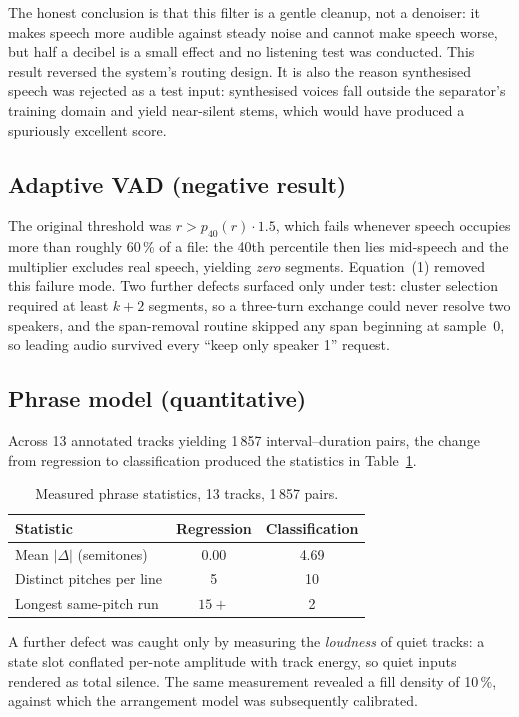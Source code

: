 \documentclass[conference]{IEEEtran}
\begin{document}
The honest conclusion is that this filter is a gentle cleanup, not a
denoiser: it makes speech more audible against steady noise and cannot make
speech worse, but half a decibel is a small effect and no listening test was
conducted. This result reversed the system's routing design.
It is also the reason synthesised speech was rejected as a test input:
synthesised voices fall outside the separator's training domain and yield
near-silent stems, which would have produced a spuriously excellent score.

\subsection{Adaptive VAD (negative result)}

The original threshold was $r > p_{40}(r)\cdot 1.5$, which fails whenever
speech occupies more than roughly 60\,\% of a file: the 40th percentile then
lies mid-speech and the multiplier excludes real speech, yielding
\emph{zero} segments. Equation~(1) removed this failure mode. Two further
defects surfaced only under test: cluster selection required at least $k+2$
segments, so a three-turn exchange could never resolve two speakers, and the
span-removal routine skipped any span beginning at sample~0, so leading audio
survived every ``keep only speaker 1'' request.

\subsection{Phrase model (quantitative)}

Across 13 annotated tracks yielding 1\,857 interval--duration pairs, the change
from regression to classification produced the statistics in
Table~\ref{tab:phrase}.

\begin{table}[t]
\centering
\caption{Measured phrase statistics, 13 tracks, 1\,857 pairs.}
\label{tab:phrase}
\begin{tabular}{lcc}
\toprule
Statistic & Regression & Classification \\
\midrule
Mean $|\Delta|$ (semitones)   & 0.00 & 4.69 \\
Distinct pitches per line    & 5    & 10 \\
Longest same-pitch run       & $15{+}$ & 2 \\
\bottomrule
\end{tabular}
\end{table}

A further defect was caught only by measuring the \emph{loudness} of quiet
tracks: a state slot conflated per-note amplitude with track energy, so quiet
inputs rendered as total silence. The same measurement revealed a fill density
of 10\,\%, against which the arrangement model was subsequently calibrated.
\end{document}
